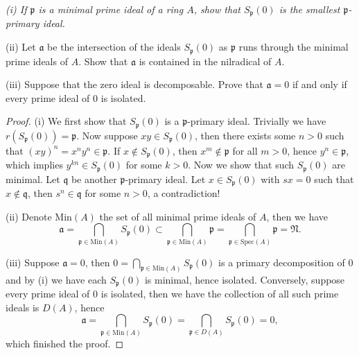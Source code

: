 \begin{problem}\em
(i) If $\mathfrak{p}$ is a minimal prime ideal of a ring $A$, show that $S_\mathfrak{p}(0)$ is the smallest $\mathfrak{p}$-primary ideal.\par
(ii) Let $\mathfrak{a}$ be the intersection of the ideals $S_\mathfrak{p}(0)$ as $\mathfrak{p}$ runs through the minimal prime ideals of $A$. Show that $\mathfrak{a}$ is contained in the nilradical of $A$.\par
(iii) Suppose that the zero ideal is decomposable. Prove that $\mathfrak{a}=0$ if and only if every prime ideal of $0$ is isolated.
\end{problem}
\begin{proof}
(i) We first show that $S_\mathfrak{p}(0)$ is a $\mathfrak{p}$-primary ideal. Trivially we have $r(S_\mathfrak{p}(0))=\mathfrak{p}$. Now suppose $xy\in S_\mathfrak{p}(0)$, then there exists some $n>0$ such that $(xy)^n=x^ny^n\in\mathfrak{p}$. If $x\notin S_\mathfrak{p}(0)$, then $x^m\notin\mathfrak{p}$ for all $m>0$, hence $y^n\in\mathfrak{p}$, which implies $y^{kn}\in S_\mathfrak{p}(0)$ for some $k>0$. Now we show that such $S_\mathfrak{p}(0)$ are minimal. Let $\mathfrak{q}$ be another $\mathfrak{p}$-primary ideal. Let $x\in S_\mathfrak{p}(0)$ with $sx=0$ such that $x\notin\mathfrak{q}$, then $s^n\in\mathfrak{q}$ for some $n>0$, a contradiction!\par
(ii) Denote $\mathrm{Min}(A)$ the set of all minimal prime ideals of $A$, then we have 
$$
\mathfrak{a} =\bigcap_{\mathfrak{p} \in \mathrm{Min}\left( A \right)}{S_{\mathfrak{p}}\left( 0 \right)}\subset \bigcap_{\mathfrak{p} \in \mathrm{Min}\left( A \right)}{\mathfrak{p}}=\bigcap_{\mathfrak{p} \in \mathrm{Spec}\left( A \right)}{\mathfrak{p}}=\mathfrak{N} .
$$\par
(iii) Suppose $\mathfrak{a}=0$, then $0=\bigcap_{\mathfrak{p}\in\mathrm{Min}(A)}S_\mathfrak{p}(0)$ is a primary decomposition of $0$ and by (i) we have each $S_\mathfrak{p}(0)$ is minimal, hence isolated. Conversely, suppose every prime ideal of $0$ is isolated, then we have the collection of all such prime ideals is $D(A)$, hence 
$$
\mathfrak{a} =\bigcap_{\mathfrak{p} \in \mathrm{Min}\left( A \right)}{S_{\mathfrak{p}}\left( 0 \right)}=\bigcap_{\mathfrak{p} \in D\left( A \right)}{S_{\mathfrak{p}}\left( 0 \right)}=0,
$$
which finished the proof.
\end{proof}

